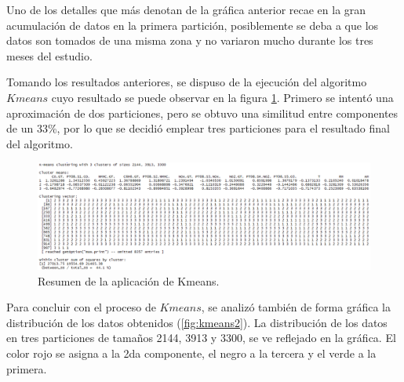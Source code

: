 \documentclass[a4paper,10pt,twocolumn]{article}
\begin{document}
  Uno de los detalles que más denotan de la gráfica anterior recae en la gran acumulación de datos en la primera partición, posiblemente se deba a que los datos son tomados de una misma zona y no variaron mucho durante los tres meses del estudio.
  
  Tomando los resultados anteriores, se dispuso de la ejecución del algoritmo $Kmeans$ cuyo resultado se puede observar en la figura \ref{fig:kmeans1}. Primero se intentó una aproximación de dos particiones, pero se obtuvo una similitud entre componentes de un 33\%, por lo que se decidió emplear tres particiones para el resultado final del algoritmo.
  
  \begin{figure}[htb]%
  	\begin{center}
  		\includegraphics[width=\linewidth]{Images/kmeansummary1.png}
  	\end{center}
  	\caption{Resumen de la aplicación de Kmeans.}
  	\label{fig:kmeans1}
  \end{figure}
  
  Para concluir con el proceso de $Kmeans$, se analizó también de forma gráfica la distribución de los datos obtenidos (\ref{fig:kmeans2}). La distribución de los datos en tres particiones de tamaños 2144, 3913 y 3300, se ve reflejado en la gráfica. El color rojo se asigna a la 2da componente, el negro a la tercera y el verde a la primera.
  
\end{document}
